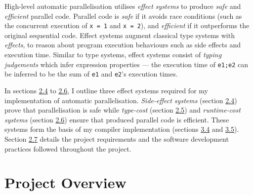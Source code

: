 




\label{sec:2}

\newcommand{\ignore}[1]{#1}
\newcommand{\bound}[2]{\langle{#1, #2}\rangle}

High-level automatic parallelisation utilises \textit{effect systems} to produce \textit{safe} and \textit{efficient} parallel code. Parallel code is \textit{safe} if it avoids race conditions (such as the concurrent execution of \ignore{\texttt{x = 1}} and \ignore{\texttt{x = 2}}), and \textit{efficient} if it outperforms the original sequential code. Effect systems augment classical type systems with \textit{effects}, to reason about program execution behaviours such as side effects and execution time. Similar to type systems, effect systems consist of \textit{typing judgements} which infer expression properties --- the execution time of \ignore{\texttt{e1;e2}} can be inferred to be the sum of \ignore{\texttt{e1}} and \ignore{\texttt{e2}}'s execution times.

In sections \hyperref[sec:2.4]{2.4} to \hyperref[sec:2.6]{2.6}, I outline three effect systems required for my implementation of automatic parallelisation. \textit{Side-effect systems} (section \hyperref[sec:2.4]{2.4}) prove that parallelisation is safe while \textit{type-cost} (section \hyperref[sec:2.5]{2.5}) and \textit{runtime-cost systems} (section \hyperref[sec:2.6]{2.6}) ensure that produced parallel code is efficient. These systems form the basis of my compiler implementation (sections \hyperref[sec:3.4]{3.4} and \hyperref[sec:3.5]{3.5}). Section \hyperref[sec:2.7]{2.7} details the project requirements and the software development practices followed throughout the project.

\section{Project Overview}

\label{sec:2.1}

